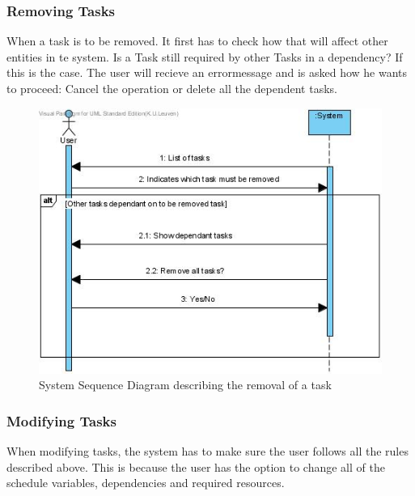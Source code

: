 \documentclass[a4paper,11pt]{article}
\begin{document}
			\subsubsection{Removing Tasks}
			When a task is to be removed. It first has to check how that will affect other entities in te system. Is a Task still required by other Tasks in a dependency?
			If this is the case. The user will recieve an errormessage and is asked how he wants to proceed: Cancel the operation or delete all the dependent tasks.
			\begin{figure}[h!]
				\begin{center}
					\includegraphics[scale=0.5]{images/ssd_remove_task.jpg}
				\end{center}
				\caption{System Sequence Diagram describing the removal of a task}
			\end{figure}
			\subsubsection{Modifying Tasks}
			When modifying tasks, the system has to make sure the user follows all the rules described above. This is because the user has the option to change all of the schedule variables, dependencies and required resources.
\end{document}
